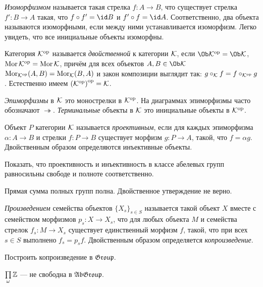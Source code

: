 \documentclass[10pt,a4paper,draft]{article}
\begin{document}
{\em Изоморфизмом} называется такая стрелка
$f:A\to B$, что существует стрелка $f':B\to A$ такая, что $f\circ
f'=\id B$ и $f'\circ f=\id A$. Соответственно, два объекта
называются изоморфными, если между ними устанавливается
изоморфизм. Легко увидеть, что все инициальные объекты изоморфны.

Категория ${\mathcal{K}}^{\mathrm{op}}$ называется {\em
двойственной} к категории $\mathcal{K}$,
если $\Ob\op{\Ck}=\Ob\Ck$, $\operatorname{Mor}{\mathcal{K}}^{\mathrm{op}}=\operatorname{Mor}\mathcal{K}$, причём для всех
объектов $A,B\in\Ob\Ck$ $\operatorname{Mor}_{{\mathcal{K}}^{\mathrm{op}}}(A,B)=\operatorname{Mor}_{\mathcal{K}}(B,A)$ и
закон композиции выглядит так: $g\circ_{\mathcal{K}}f=f\circ_{{\mathcal{K}}^{\mathrm{op}}}g$.
Естественно имеем ${({\mathcal{K}}^{\mathrm{op}})}^{\mathrm{op}}=\mathcal{K}$.

{\em Эпиморфизмы} в $\mathcal{K}$ это монострелки в
${\mathcal{K}}^{\mathrm{op}}$. На диаграммах эпиморфизмы часто обозначают
$\twoheadrightarrow$. {\em
Терминальные} объекты в $\mathcal{K}$ это
инициальные объекты в ${\mathcal{K}}^{\mathrm{op}}$.

Объект $P$ категории $\mathcal{K}$ называется {\em
проективным}, если для каждых
эпиморфизма $\alpha:A\to B$ и стрелки $f:P\to B$ существует
морфизм $g:P\to A$, такой, что $f=\alpha g$. Двойственным образом
определяются инъективные объекты.

\begin{problem} Показать, что проективность и инъективность в классе
абелевых групп равносильны свободе и полноте соответственно.
\end{problem}

Прямая сумма полных групп полна. Двойственное утверждение не
верно.

\vskip-12pt  \hangindent=-30mm 
{\em Произведением} семейства
объектов $\{X_s\}_{s\in S}$ называется такой объект $X$ вместе с
семейством морфизмов $p_s:X\to X_s$, что для любых объекта $M$ и
семейства стрелок $f_s:M\to X_s$ существует единственный морфизм
$f$, такой, что при всех $s\in S$ выполнено $f_s=p_sf$.
Двойственным образом определяется {\em
копроизведение}.

\begin{problem}
Построить копроизведение в $\mathfrak{Group}$.
\end{problem}

\begin{problem} $\prod\limits_\omega \mathbb Z$ --- не свободна в
$\mathfrak{AbGroup}$.
\end{problem}
\end{document}
